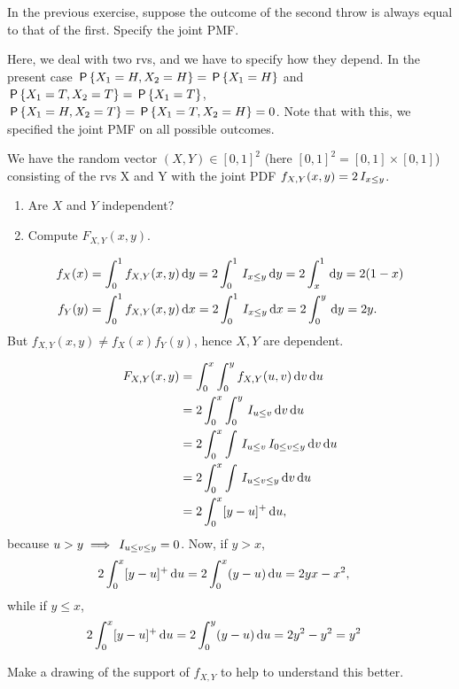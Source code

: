 \begin{exercise}
In the previous exercise, suppose the outcome of the second throw is always equal to that of the first. Specify the joint PMF.
\begin{solution}
Here, we deal with two rvs, and we have to specify how they depend. In the present case $\P{X_1= H, X_2=H} = \P{X_1=H}$ and $\P{X_1= T, X_2=T} = \P{X_1=T}$, $\P{X_1= H, X_2=T} = \P{X_1= T, X_2=H} = 0$. Note that with this, we specified the joint PMF on all possible outcomes.
\end{solution}
\end{exercise}


\begin{exercise}
We have the random vector $(X, Y) \in [0,1]^{2}$ (here $[0,1]^{2} = [0,1]\times [0,1]$) consisting of the rvs X and Y with the joint PDF $f_{X,Y}(x,y) = 2 \1{x\leq y}$.
\begin{enumerate}
\item Are $X$ and $Y$ independent?
\item Compute $F_{X,Y}(x,y)$.
\end{enumerate}
\begin{solution}
\begin{align}
f_{X}(x) &= \int_{0}^{1} f_{X,Y}(x,y) \d y = 2\int_{0}^{1} \1{x\leq y} \d y = 2\int_{x}^{1} \d y = 2(1-x) \\
f_{Y}(y) &= \int_{0}^{1} f_{X,Y}(x,y) \d x = 2\int_{0}^{1} \1{x\leq y} \d x = 2\int_{0}^{y} \d y = 2 y.
\end{align}
But $f_{X,Y}(x,y) \neq f_{X}(x)f_{Y}(y)$, hence $X,Y$ are dependent.

\begin{align}
F_{X,Y}(x,y)
&= \int_{0}^{x}\int_{0}^{y} f_{X,Y}(u,v) \d v \d u \\
&= 2\int_{0}^{x}\int_{0}^{y} \1{u\leq v} \d v \d u \\
&= 2\int_{0}^{x}\int \1{u\leq v} \1{0\leq v \leq y}\d v \d u \\
&= 2\int_{0}^{x}\int  \1{u\leq v \leq y}\d v \d u \\
&= 2\int_{0}^{x} [y-u]^{+} \d u,
\end{align}
because $u > y \implies \1{u\leq v \leq y} = 0$. Now, if $y>x$,
\begin{align}
  2\int_{0}^{x} [y-u]^{+} \d u &=
  2\int_{0}^{x} (y-u) \d u = 2 y x - x^{2},
\end{align}
while if $y\leq x$,
\begin{align}
  2\int_{0}^{x} [y-u]^{+} \d u &=
  2\int_{0}^{y} (y-u) \d u = 2 y^{2} - y^{2} = y^{2}
\end{align}

Make a drawing of the support of $f_{X,Y}$ to help to understand this better.

\end{solution}
\end{exercise}

